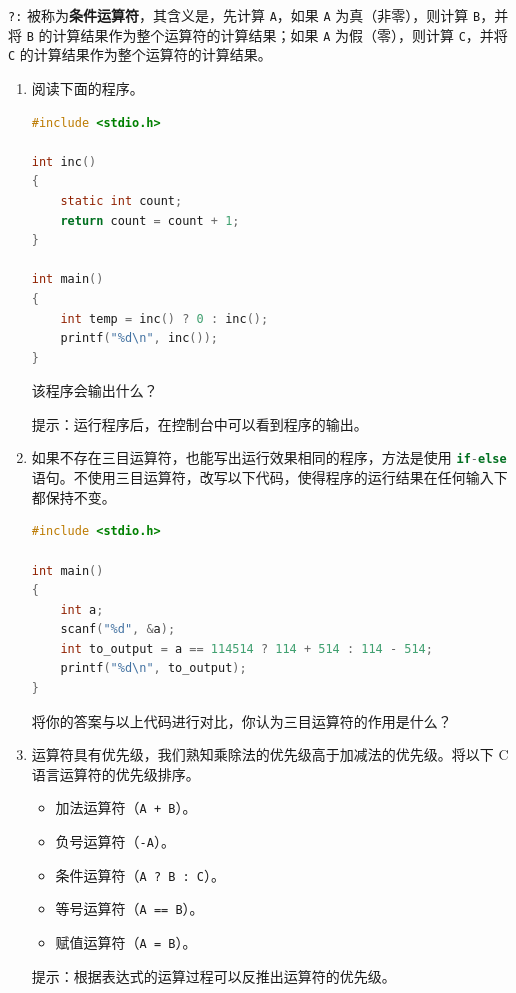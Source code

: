 \begin{problemset}
	\lstinline{?:} 被称为\textbf{条件运算符}，其含义是，先计算 \lstinline{A}，如果 \lstinline{A} 为真（非零），则计算 \lstinline{B}，并将 \lstinline{B} 的计算结果作为整个运算符的计算结果；如果 \lstinline{A} 为假（零），则计算 \lstinline{C}，并将 \lstinline{C}  的计算结果作为整个运算符的计算结果。

	\begin{enumerate}
		\item 阅读下面的程序。

		\begin{lstlisting}[language=c]
#include <stdio.h>

int inc()
{
	static int count;
	return count = count + 1;
}

int main()
{
	int temp = inc() ? 0 : inc();
	printf("%d\n", inc());
}
		\end{lstlisting}

		该程序会输出什么？

		提示：运行程序后，在控制台中可以看到程序的输出。

		\item 如果不存在三目运算符，也能写出运行效果相同的程序，方法是使用 \lstinline[language=c]{if-else} 语句。不使用三目运算符，改写以下代码，使得程序的运行结果在任何输入下都保持不变。

		\begin{lstlisting}[language=c]
#include <stdio.h>

int main()
{
	int a;
	scanf("%d", &a);
	int to_output = a == 114514 ? 114 + 514 : 114 - 514;
	printf("%d\n", to_output);
}
		\end{lstlisting}

		将你的答案与以上代码进行对比，你认为三目运算符的作用是什么？

		\item 运算符具有优先级，我们熟知乘除法的优先级高于加减法的优先级。将以下 C 语言运算符的优先级排序。
		\begin{itemize}
			\item 加法运算符（\lstinline{A + B}）。
			\item 负号运算符（\lstinline{-A}）。
			\item 条件运算符（\lstinline{A ? B : C}）。
			\item 等号运算符（\lstinline{A == B}）。
			\item 赋值运算符（\lstinline{A = B}）。
		\end{itemize}

		提示：根据表达式的运算过程可以反推出运算符的优先级。
	\end{enumerate}


\end{problemset}
